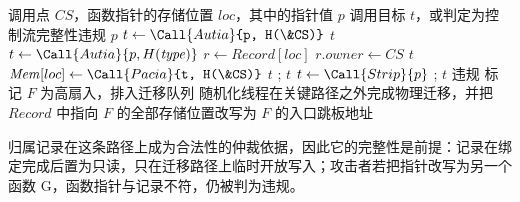 \begin{algorithm}[!htbp]
    \caption{间接调用处的检查与归属仲裁}
    \label{alg:5-1}
    \begin{algorithmic}[1]
        \Require 调用点 $CS$，函数指针的存储位置 $loc$，其中的指针值 $p$
        \Ensure 调用目标 $t$，或判定为控制流完整性违规
             
                \State \Return $p$
            \EndIf
            \State $t \gets \Call{Autia}{p, H(\&CS)}$ 
             \State \Return $t$ \EndIf
            \State $t \gets \Call{Autia}{p, H(\mathit{type})}$ 
            \State $r \gets \mathit{Record}[loc]$ 
             
                 
                     $r.\mathit{owner} \gets CS$
                      
                    \EndIf
                    \State \Return $t$
                \EndIf
                 
                    \State $\mathit{Mem}[loc] \gets \Call{Pacia}{t, H(\&CS)}$ 
                    \State \Return $t$
                \EndIf
                \State {}; \Return $t$ 
            \Else {}
                \State $t \gets \Call{Strip}{p}$
                 
                    \State {}; \Return $t$
                \EndIf
                \State \Return 违规
            \EndIf
        \EndFunction
        \Statex
         
            \State 标记 $F$ 为高扇入，排入迁移队列
            \State 随机化线程在关键路径之外完成物理迁移，并把 $\mathit{Record}$ 中指向 $F$ 的全部存储位置改写为 $F$ 的入口跳板地址
        \EndProcedure
    \end{algorithmic}
\end{algorithm}

归属记录在这条路径上成为合法性的仲裁依据，因此它的完整性是前提：记录在绑定完成后置为只读，只在迁移路径上临时开放写入；攻击者若把指针改写为另一个函数 G，函数指针与记录不符，仍被判为违规。

